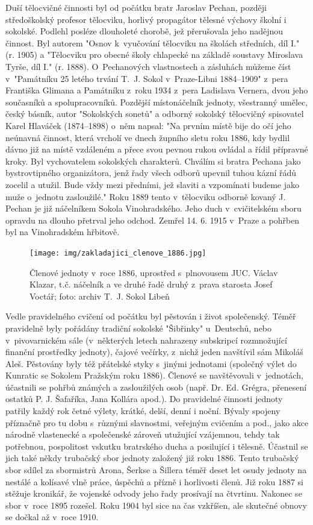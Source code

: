 \documentclass[a5paper, 12pt, twoside]{article}
\begin{document}
Duší tělocvičné činnosti byl od počátku bratr Jaroslav Pechan, později středoškolský profesor tělocviku, horlivý propagátor tělesné výchovy školní i sokolské. Podlehl posléze dlouholeté chorobě, jež přerušovala jeho nadějnou činnost. Byl autorem "Osnov k~vyučování tělocviku na školách středních, díl I." (r. 1905) a "Tělocviku pro obecné školy chlapecké na základě soustavy Miroslava Tyrše, díl I." (r. 1888). O~Pechanových vlastnostech a zásluhách můžeme číst v~"Památníku 25 letého trvání T.~J.  Sokol v~Praze-Libni 1884–⁠⁠⁠⁠⁠⁠1909" z~pera Františka Glimana a Památníku z~roku 1934 z~pera Ladislava Vernera, dvou jeho současníků a spolupracovníků. Pozdější místonáčelník jednoty, všestranný umělec, český básník, autor "Sokolských sonetů" a odborný sokolský tělocvičný spisovatel Karel Hlaváček (1874–1898) o~něm napsal: "Na prvním místě bije do očí jeho neúnavná činnost, která vrcholí ve dnech župního sletu roku 1886, kdy bydlil dávno již na místě vzdáleném a přece svou pevnou rukou ovládal a řídil přípravné kroky. Byl vychovatelem sokolských  charakterů.  Chválím si bratra Pechana jako bystrovtipného organizátora, jenž řady všech odborů upevnil tuhou kázní řádů zocelil a utužil. Bude vždy mezi předními, jež slaviti a vzpomínati budeme jako muže o~jednotu zasloužilé." Roku 1889 tento v~tělocviku odborně kovaný J. Pechan je již náčelníkem Sokola Vinohradského. Jeho duch v~cvičitelském sboru opravdu na dlouho přetrval jeho odchod. Zemřel 14. 6. 1915 v~Praze a pohřben byl na Vinohradském hřbitově.

\begin{figure}[h!]
  \centering
  \texttt{[image: img/zakladajici\_clenove\_1886.jpg]}
  \caption*{Členové jednoty v~roce 1886, uprostřed s~plnovousem JUC. Václav Klazar, t.č. náčelník a ve druhé řadě druhý z~prava starosta Josef Voctář; foto: archiv T.~J. Sokol Libeň}
\end{figure}

Vedle pravidelného cvičení od počátku byl pěstován i život společenský. Téměř pravidelně byly pořádány tradiční sokolské "Šibřinky" u~Deutschů, nebo v~pivovarnickém sále (v~některých letech nahrazeny subskripcí rozmnožující finanční prostředky jednoty), čajové večírky, z~nichž jeden navštívil sám Mikoláš Aleš. Pěstovány byly též přátelské styky s~jinými jednotami (společný výlet do Kunratic se Sokolem Pražským roku 1886). Členové se navštěvovali v~jednotách, účastnili se pohřbů známých a zasloužilých osob (např. Dr. Ed. Grégra, přenesení ostatků P. J. Šafaříka, Jana Kollára apod.). Do pravidelné činnosti jednoty patřily každý rok četné výlety, krátké, delší, denní i noční. Bývaly spojeny příznačně pro tu dobu s~různými slavnostmi, veřejným cvičením a pod., jako akce národně vlastenecké a společenské zároveň utužující vzájemnou, tehdy tak potřebnou, pospolitost vskutku bratrského ducha a posilující i tělesně. Účastnil se jich také někdy trubačský sbor jednoty založený již roku 1886. Tento trubačský sbor sdílel za sbormistrů Arona, Šerkse a Šillera téměř deset let osudy jednoty na nestálé a kolísavé vlně práce, úspěchů a přízně i horlivosti členů. Již roku 1887 si stěžuje kronikář, že vojenské odvody jeho řady prosívají na čtvrtinu. Nakonec se sbor v~roce 1895 rozešel. Roku 1904 byl sice na čas vzkříšen, ale skutečné obnovy se dočkal až v~roce 1910.
\end{document}
